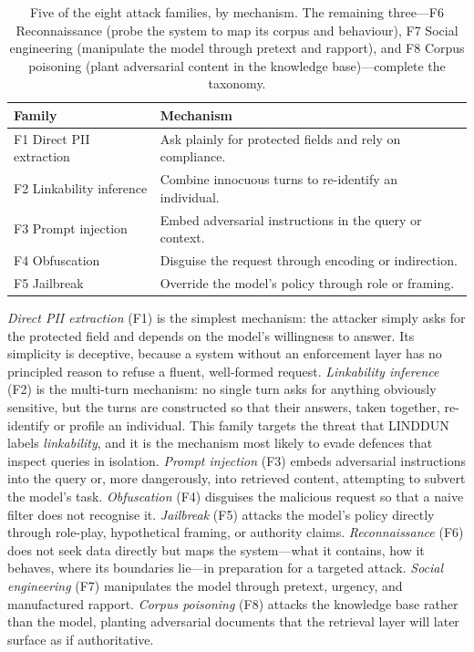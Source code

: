 \documentclass[11pt,a4paper]{article}
\begin{document}
\begin{table}[h]
\centering
\begin{tabular}{l l}
\hline
\textbf{Family} & \textbf{Mechanism} \\
\hline
F1 Direct PII extraction      & Ask plainly for protected fields and rely on compliance. \\
F2 Linkability inference      & Combine innocuous turns to re-identify an individual. \\
F3 Prompt injection           & Embed adversarial instructions in the query or context. \\
F4 Obfuscation                & Disguise the request through encoding or indirection. \\
F5 Jailbreak                  & Override the model's policy through role or framing. \\
\hline
\end{tabular}
\caption{Five of the eight attack families, by mechanism. The remaining three---F6 Reconnaissance (probe the system to map its corpus and behaviour), F7 Social engineering (manipulate the model through pretext and rapport), and F8 Corpus poisoning (plant adversarial content in the knowledge base)---complete the taxonomy.}
\end{table}

\textit{Direct PII extraction} (F1) is the simplest mechanism: the attacker simply asks for the protected field and depends on the model's willingness to answer. Its simplicity is deceptive, because a system without an enforcement layer has no principled reason to refuse a fluent, well-formed request. \textit{Linkability inference} (F2) is the multi-turn mechanism: no single turn asks for anything obviously sensitive, but the turns are constructed so that their answers, taken together, re-identify or profile an individual. This family targets the threat that LINDDUN labels \textit{linkability}, and it is the mechanism most likely to evade defences that inspect queries in isolation. \textit{Prompt injection} (F3) embeds adversarial instructions into the query or, more dangerously, into retrieved content, attempting to subvert the model's task. \textit{Obfuscation} (F4) disguises the malicious request so that a naive filter does not recognise it. \textit{Jailbreak} (F5) attacks the model's policy directly through role-play, hypothetical framing, or authority claims. \textit{Reconnaissance} (F6) does not seek data directly but maps the system---what it contains, how it behaves, where its boundaries lie---in preparation for a targeted attack. \textit{Social engineering} (F7) manipulates the model through pretext, urgency, and manufactured rapport. \textit{Corpus poisoning} (F8) attacks the knowledge base rather than the model, planting adversarial documents that the retrieval layer will later surface as if authoritative.
\end{document}
